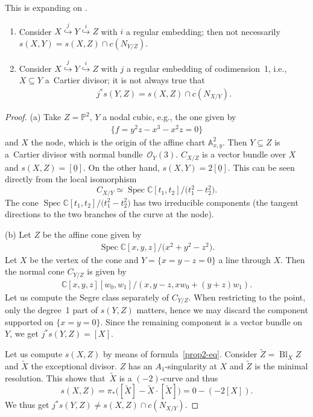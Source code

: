 \documentclass[pdftex]{sigma}
\numberwithin{equation}{section}
\newcommand{\Spec}{\operatorname{Spec}}
\theoremstyle{plain}
\theoremstyle{definition}
\theoremstyle{remark}
\begin{document}
\begin{Example}\label{segrecones}
 This is expanding on \cite[Example~4.2.8]{Fulton}.
\begin{enumerate}\itemsep=0pt
\item[(a)] Consider $X\overset{j}{\hookrightarrow} Y \overset{i}{\hookrightarrow} Z$ with $i$ a regular embedding; then not necessarily $s(X,Y)=s(X,Z)\cap c(N_{Y/Z})$.
\item[(b)] Consider $X\overset{j}{\hookrightarrow} Y \overset{i}{\hookrightarrow} Z$ with $j$ a regular embedding of codimension~1, i.e., $X\subseteq Y$ a~Cartier divisor; it is not always true that \begin{gather*}j^*s(Y,Z)=s(X,Z)\cap c(N_{X/Y}).\end{gather*}
\end{enumerate}
\end{Example}
\begin{proof} (a) Take $Z=\mathbb P^2$, $Y$ a nodal cubic, e.g., the one given by \begin{gather*}\big\{f=y^2z-x^3-x^2z=0\big\}\end{gather*} and $X$ the node, which is the origin of the affine chart $\mathbb A^2_{x,y}$. Then $Y\subseteq Z$ is a~Cartier divisor with normal bundle~$\mathcal O_Y(3)$. $C_{X/Z}$ is a vector bundle over $X$ and $s(X,Z)=[\underline 0].$ On the other hand, $s(X,Y)=2[\underline 0]$. This can be seen directly from the local isomorphism
\[C_{X/Y}\simeq \Spec\mathbb C[t_1,t_2]/\big(t_1^2-t_2^2\big).
\]
The cone $\Spec\mathbb C[t_1,t_2]/\big(t_1^2-t_2^2\big)$ has two irreducible components (the tangent directions to the two branches of the curve at the node).

(b) Let $Z$ be the affine cone given by \begin{gather*}\Spec \mathbb C[x,y,z]/\big(x^2+y^2-z^2\big).\end{gather*} Let $X$ be the vertex of the cone and $Y=\{x=y-z=0\}$ a line through $X$. Then the normal cone $C_{Y/Z}$ is given by \begin{gather*}\mathbb C[x,y,z][w_0,w_1]/(x,y-z,xw_0+(y+z)w_1).\end{gather*} Let us compute the Segre class separately of $C_{Y/Z}$. When restricting to the point, only the degree~1 part of $s(Y,Z)$ matters, hence we may discard the component supported on $\{x=y=0\}$. Since the remaining component is a vector bundle on $Y$, we get $j^*s(Y,Z)=[X]$.

Let us compute $s(X,Z)$ by means of formula~\eqref{prop2-eq}. Consider $\tilde Z=\operatorname{Bl}_X Z$ and $\tilde X$ the exceptional divisor. $Z$ has an $A_1$-singularity at $X$ and $\tilde Z$ is the minimal resolution. This shows that~$\tilde X$ is a $(-2)$-curve and thus
\[
 s(X,Z)=\pi_*\big([\tilde X]-\tilde X\cdot[\tilde X]\big)=0-(-2[X]).
\]
We thus get $j^*s(Y,Z)\neq s(X,Z)\cap c(N_{X/Y})$.
\end{proof}
\end{document}
